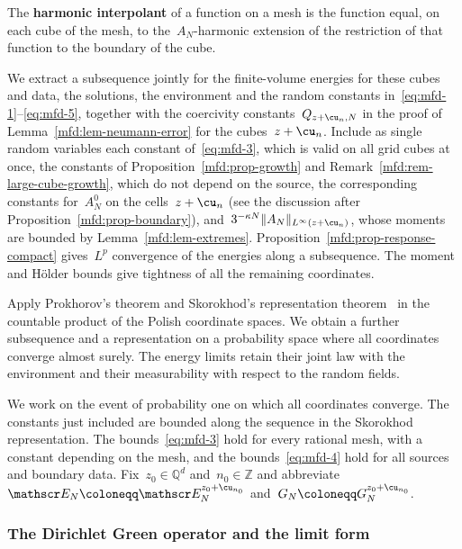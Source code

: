 \documentclass[11pt]{amsart}
\begin{document}
\smallskip

The \textbf{harmonic interpolant} of a function on a mesh is the function equal, on each cube of the mesh, to the~$A_N$-harmonic extension of the restriction of that function to the boundary of the cube.

\smallskip

We extract a subsequence jointly for the finite-volume energies for these cubes and data, the solutions, the environment and the random constants in~\eqref{eq:mfd-1}--\eqref{eq:mfd-5}, together with the coercivity constants~$Q_{z+\cu_n,N}$ in the proof of Lemma~\ref{mfd:lem-neumann-error} for the cubes~$z+\cu_n$. Include as single random variables each constant of~\eqref{eq:mfd-3}, which is valid on all grid cubes at once, the constants of Proposition~\ref{mfd:prop-growth} and Remark~\ref{mfd:rem-large-cube-growth}, which do not depend on the source, the corresponding constants for~$A_N^0$ on the cells~$z+\cu_n$ (see the discussion after Proposition~\ref{mfd:prop-boundary}), and~$3^{-\kappa N}\|A_N\|_{L^\infty(z+\cu_n)}$, whose moments are bounded by Lemma~\ref{mfd:lem-extremes}. Proposition~\ref{mfd:prop-response-compact} gives~$L^p$ convergence of the energies along a subsequence. The moment and H\"older bounds give tightness of all the remaining coordinates.

\smallskip

Apply Prokhorov's theorem and Skorokhod's representation theorem~\citep[Theorems~16.3 and~4.30]{Kallenberg} in the countable product of the Polish coordinate spaces. We obtain a further subsequence and a representation on a probability space where all coordinates converge almost surely. The energy limits retain their joint law with the environment and their measurability with respect to the random fields.

\smallskip

We work on the event of probability one on which all coordinates converge. The constants just included are bounded along the sequence in the Skorokhod representation. The bounds~\eqref{eq:mfd-3} hold for every rational mesh, with a constant depending on the mesh, and the bounds~\eqref{eq:mfd-4} hold for all sources and boundary data. Fix~$z_0\in\mathbb Q^d$ and~$n_0\in\mathbb Z$ and abbreviate~$\mathscr E_N\coloneqq \mathscr E_N^{z_0+\cu_{n_0}}$ and~$G_N\coloneqq G_N^{z_0+\cu_{n_0}}$.

\subsubsection{The Dirichlet Green operator and the limit form}
\end{document}
